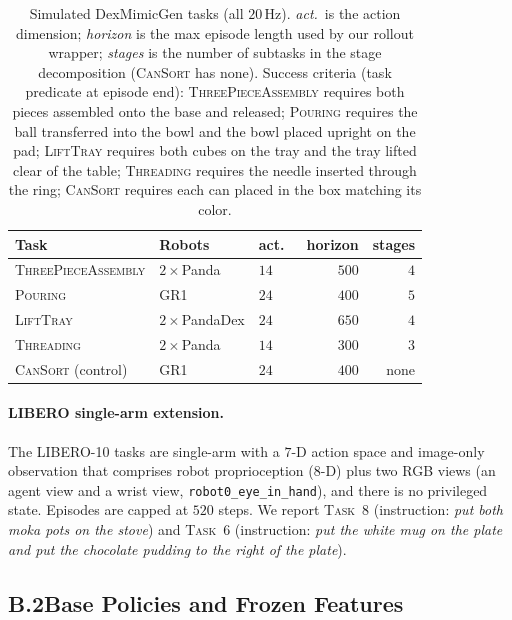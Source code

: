 \documentclass[letterpaper]{article} %
\begin{document}
\begin{table}[t]
\centering\small\setlength{\tabcolsep}{4pt}
\begin{tabular}{@{}lllrr@{}}
\toprule
Task & Robots & act.\ & horizon & stages \\
\midrule
\textsc{ThreePieceAssembly} & $2{\times}$Panda    & $14$ & $500$ & $4$ \\
\textsc{Pouring}            & GR1                 & $24$ & $400$ & $5$ \\
\textsc{LiftTray}           & $2{\times}$PandaDex  & $24$ & $650$ & $4$ \\
\textsc{Threading}          & $2{\times}$Panda    & $14$ & $300$ & $3$ \\
\textsc{CanSort} (control)  & GR1                 & $24$ & $400$ & none \\
\bottomrule
\end{tabular}
\caption{Simulated DexMimicGen tasks (all $20$\,Hz). \emph{act.}\ is the action
dimension; \emph{horizon} is the max episode length used by our rollout wrapper;
\emph{stages} is the number of subtasks in the stage decomposition (\textsc{CanSort}
has none). Success criteria (task predicate at episode end): \textsc{ThreePieceAssembly} requires both
pieces assembled onto the base and released; \textsc{Pouring} requires the ball transferred into
the bowl and the bowl placed upright on the pad; \textsc{LiftTray} requires both cubes on the
tray and the tray lifted clear of the table; \textsc{Threading} requires the needle inserted
through the ring; \textsc{CanSort} requires each can placed in the box matching its color.}
\label{tab:simtasks}
\end{table}

\paragraph{LIBERO single-arm extension.}
The LIBERO-10 tasks are single-arm with a $7$-D action space and image-only
observation that comprises robot proprioception ($8$-D) plus two RGB views (an agent view and a
wrist view, \texttt{robot0\_eye\_in\_hand}), and there is no privileged state. Episodes are
capped at $520$ steps. We report \textsc{Task~8} (instruction: \emph{put both moka
pots on the stove}) and \textsc{Task~6} (instruction: \emph{put the white mug on the
plate and put the chocolate pudding to the right of the plate}).

\subsection{B.2\quad Base Policies and Frozen Features}
\end{document}
